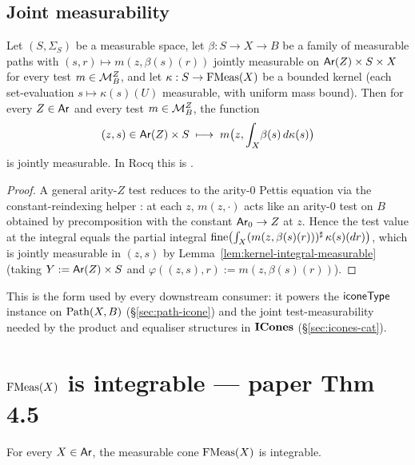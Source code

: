 \subsection{Joint measurability}\label{ssec:joint-meas}

\begin{lemma}\label{lem:integral-joint-meas}
Let $(S, \Sigma_S)$ be a measurable space, let $\beta : S \to X \to B$
be a family of measurable paths with $(s, r) \mapsto m(z, \beta(s)(r))$
jointly measurable on $\mathsf{Ar}(Z) \times S \times X$ for every test
$m \in \mathcal{M}^Z_B$, and let $\kappa : S \to \mathrm{FMeas}(X)$ be a bounded
kernel (each set-evaluation $s \mapsto \kappa(s)(U)$ measurable, with
uniform mass bound). Then for every $Z \in \mathsf{Ar}$ and every test
$m \in \mathcal{M}^Z_B$, the function
\[
  (z, s) \in \mathsf{Ar}(Z) \times S \;\longmapsto\;
  m\bigl(z, \int_{X}\!\beta(s)\,d\kappa(s)\bigr)
\]
is jointly measurable. In Rocq this is
.
\rocqok
\end{lemma}

\begin{proof}
A general arity-$Z$ test reduces to the arity-$0$ Pettis equation
via the constant-reindexing helper
: at
each $z$, $m(z, \cdot)$ acts like an arity-$0$ test on $B$ obtained
by precomposition with the constant $\mathsf{Ar}_0 \to Z$ at $z$. Hence the
test value at the integral equals the partial integral
$\mathrm{fine}\bigl(\int_X (m(z, \beta(s)(r)))^\sharp\, \kappa(s)(dr)\bigr)$,
which is jointly measurable in $(z, s)$ by
Lemma~\ref{lem:kernel-integral-measurable} (taking $Y := \mathsf{Ar}(Z) \times S$
and $\varphi((z, s), r) := m(z, \beta(s)(r))$).
\end{proof}

This is the form used by every downstream consumer: it powers the
$\mathsf{iconeType}$ instance on $\mathrm{Path}(X, B)$ (\S\ref{sec:path-icone}) and
the joint test-measurability needed by the product and equaliser
structures in $\mathbf{ICones}$ (\S\ref{sec:icones-cat}).

\section{\texorpdfstring{$\mathrm{FMeas}(X)$}{FMeas(X)} is integrable --- paper Thm 4.5}\label{sec:fmeas-icone}

\begin{theorem}\label{thm:fmeas-icone}
For every $X \in \mathsf{Ar}$, the measurable cone $\mathrm{FMeas}(X)$ is integrable.
\rocqok
\end{theorem}

